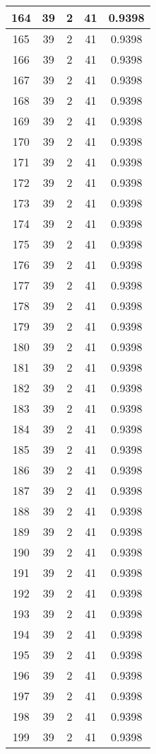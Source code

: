 \documentclass[letterpaper, 12pt]{article}
\begin{document}
\begin{longtable}{|c|c|c|c|c|}
\hline
164 & 39 & 2 & 41 & 0.9398 \\
\hline
165 & 39 & 2 & 41 & 0.9398 \\
\hline
166 & 39 & 2 & 41 & 0.9398 \\
\hline
167 & 39 & 2 & 41 & 0.9398 \\
\hline
168 & 39 & 2 & 41 & 0.9398 \\
\hline
169 & 39 & 2 & 41 & 0.9398 \\
\hline
170 & 39 & 2 & 41 & 0.9398 \\
\hline
171 & 39 & 2 & 41 & 0.9398 \\
\hline
172 & 39 & 2 & 41 & 0.9398 \\
\hline
173 & 39 & 2 & 41 & 0.9398 \\
\hline
174 & 39 & 2 & 41 & 0.9398 \\
\hline
175 & 39 & 2 & 41 & 0.9398 \\
\hline
176 & 39 & 2 & 41 & 0.9398 \\
\hline
177 & 39 & 2 & 41 & 0.9398 \\
\hline
178 & 39 & 2 & 41 & 0.9398 \\
\hline
179 & 39 & 2 & 41 & 0.9398 \\
\hline
180 & 39 & 2 & 41 & 0.9398 \\
\hline
181 & 39 & 2 & 41 & 0.9398 \\
\hline
182 & 39 & 2 & 41 & 0.9398 \\
\hline
183 & 39 & 2 & 41 & 0.9398 \\
\hline
184 & 39 & 2 & 41 & 0.9398 \\
\hline
185 & 39 & 2 & 41 & 0.9398 \\
\hline
186 & 39 & 2 & 41 & 0.9398 \\
\hline
187 & 39 & 2 & 41 & 0.9398 \\
\hline
188 & 39 & 2 & 41 & 0.9398 \\
\hline
189 & 39 & 2 & 41 & 0.9398 \\
\hline
190 & 39 & 2 & 41 & 0.9398 \\
\hline
191 & 39 & 2 & 41 & 0.9398 \\
\hline
192 & 39 & 2 & 41 & 0.9398 \\
\hline
193 & 39 & 2 & 41 & 0.9398 \\
\hline
194 & 39 & 2 & 41 & 0.9398 \\
\hline
195 & 39 & 2 & 41 & 0.9398 \\
\hline
196 & 39 & 2 & 41 & 0.9398 \\
\hline
197 & 39 & 2 & 41 & 0.9398 \\
\hline
198 & 39 & 2 & 41 & 0.9398 \\
\hline
199 & 39 & 2 & 41 & 0.9398 \\
\hline
\end{longtable}
\end{document}
